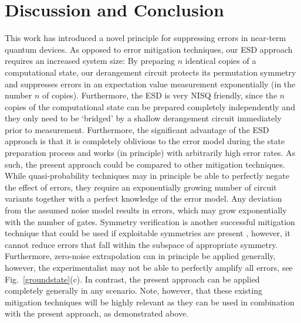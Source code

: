 \documentclass[aps,prx,showpacs,twocolumn,reprint]{revtex4-2}
\begin{document}
{\section{Discussion and Conclusion}

This work has introduced a novel principle
for suppressing errors in near-term quantum devices. As opposed to error mitigation
techniques, our ESD approach requires an increased system size:
By preparing $n$ identical copies of a computational state, our derangement
circuit protects its permutation symmetry and suppresses errors in an
expectation value measurement exponentially (in the number $n$ of copies).
Furthermore, the ESD is very NISQ friendly, since the $n$ copies
of the computational state can be prepared completely independently
and they only need to be `bridged' by a shallow derangement circuit
immediately prior to measurement.
Furthermore, the significant advantage of the ESD approach is that it is completely oblivious to the error
model during the state preparation process and works (in principle) with arbitrarily high error
rates.
As such, the present approach could be compared to other mitigation techniques.
While quasi-probability techniques
\cite{PhysRevLett.119.180509,PhysRevX.8.031027, strikis2020learning, czarnik2020error}
may in principle be able to perfectly negate the effect of errors, they require
an exponentially growing number of circuit variants together with a perfect knowledge
of the error model. Any deviation from the assumed noise model results in errors,
which may grow exponentially with the number of gates.
Symmetry verification is another successful mitigation technique that could be used
if exploitable symmetries are present \cite{PhysRevA.98.062339,PhysRevLett.122.180501},
however, it cannot reduce errors that fall within the subspace of appropriate symmetry.
Furthermore, zero-noise extrapolation \cite{endo2020hybrid,Li2017,PhysRevX.8.031027, kandala2018extending,PhysRevLett.119.180509,cai2020multi}
can in principle be applied generally, however, the experimentalist may not
be able to perfectly amplify all errors, see Fig.~\ref{groundstate}(c). 
In contrast, the present approach can be applied completely generally in any scenario.
Note, however, that these existing mitigation techniques will be highly relevant as they can
be used in combination with the present approach, as demonstrated above.


}
\end{document}
